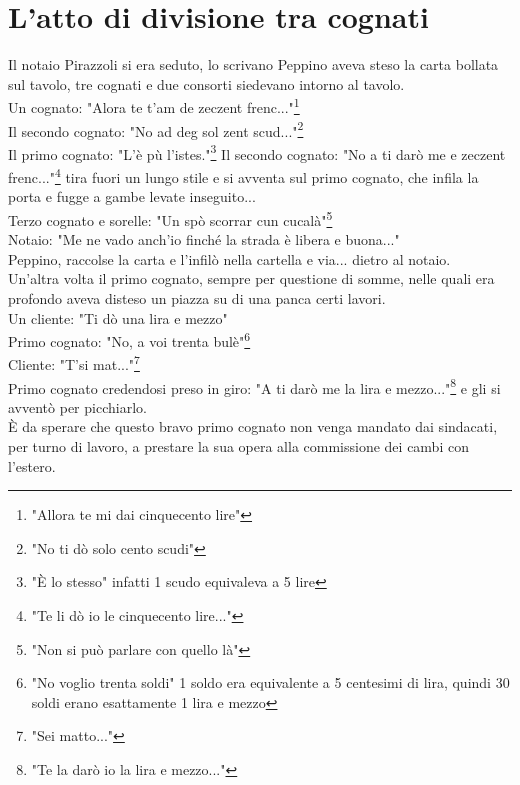 \documentclass[10pt]{memoir} %
\begin{document}
\chapter{L'atto di divisione tra cognati}
Il notaio Pirazzoli si era seduto, lo scrivano Peppino aveva steso la carta bollata sul tavolo, tre cognati e due consorti siedevano intorno al tavolo. \\
Un cognato: "Alora te t'am de zeczent frenc..."\footnote{"Allora te mi dai cinquecento lire"}\\
Il secondo cognato: "No ad deg sol zent scud..."\footnote{"No ti dò solo cento scudi"}\\
Il primo cognato: "L'è pù l'istes."\footnote{"È lo stesso" infatti 1 scudo equivaleva a 5 lire}
Il secondo cognato: "No a ti darò me e zeczent frenc..."\footnote{"Te li dò io le cinquecento lire..."} tira fuori un lungo stile e si avventa sul primo cognato, che infila la porta e fugge a gambe levate inseguito...\\
Terzo cognato e sorelle: "Un spò scorrar cun cucalà"\footnote{"Non si può parlare con quello là"}\\
Notaio: "Me ne vado anch'io finché la strada è libera e buona..."\\
Peppino, raccolse la carta e l'infilò nella cartella e via... dietro al notaio.\\
Un'altra volta il primo cognato, sempre per questione di somme, nelle quali era profondo aveva disteso un piazza su di una panca certi lavori.\\
Un cliente: "Ti dò una lira e mezzo"\\
Primo cognato: "No, a voi trenta bulè"\footnote{"No voglio trenta soldi" 1 soldo era equivalente a 5 centesimi di lira, quindi 30 soldi erano esattamente 1 lira e mezzo}\\
Cliente: "T'si mat..."\footnote{"Sei matto..."}\\
Primo cognato credendosi preso in giro: "A ti darò me la lira e mezzo..."\footnote{"Te la darò io la lira e mezzo..."} e gli si avventò per picchiarlo.\\
È da sperare che questo bravo primo cognato non venga mandato dai sindacati, per turno di lavoro, a prestare la sua opera alla commissione dei cambi con l'estero.\\

\end{document}
